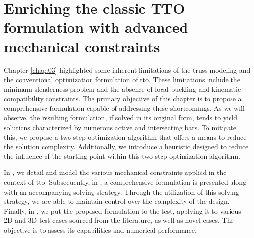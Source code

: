 \setchapterpreamble[u]{\margintoc}
\glsresetall %
\chapter{Enriching the classic TTO formulation with advanced mechanical constraints}
\label{chap:04}
Chapter \ref{chap:03} highlighted some inherent limitations of the truss modeling and the conventional optimization formulation of \gls{tto}. These limitations include the minimum slenderness problem and the absence of local buckling and kinematic compatibility constraints. The primary objective of this chapter is to propose a comprehensive formulation capable of addressing these shortcomings. As we will observe, the resulting formulation, if solved in its original form, tends to yield solutions characterized by numerous active and intersecting bars. To mitigate this, we propose a two-step optimization algorithm that offers a means to reduce the solution complexity. Additionally, we introduce a heuristic designed to reduce the influence of the starting point within this two-step optimization algorithm.

In , we detail and model the various mechanical constraints applied in the context of \gls{tto}. Subsequently, in , a comprehensive formulation is presented along with an accompanying solving strategy. Through the utilization of this solving strategy, we are able to maintain control over the complexity of the design. Finally, in , we put the proposed formulation to the test, applying it to various 2D and 3D test cases sourced from the literature, as well as novel cases. The objective is to assess its capabilities and numerical performance.

